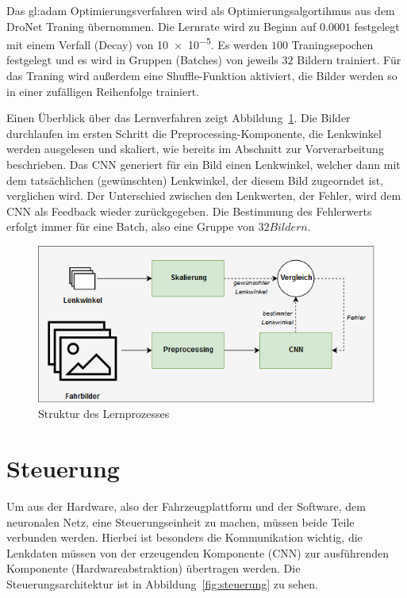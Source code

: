 Das \gls{gl:adam} Optimierungsverfahren \cite{kingma2014adam} wird als Optimierungsalgortihmus aus dem DroNet Traning übernommen.
Die Lernrate wird zu Beginn auf $0.0001$ festgelegt mit einem Verfall (Decay) von \num{10e-5}. Es werden $100$ Traningsepochen festgelegt und es wird in Gruppen (Batches) von jeweils $32$ Bildern trainiert. Für das Traning wird außerdem eine Shuffle-Funktion aktiviert, die Bilder werden so in einer zufälligen Reihenfolge trainiert.

Einen Überblick über das Lernverfahren zeigt Abbildung~\ref{img:lernarchitektur}. Die Bilder durchlaufen im ersten Schritt die Preprocessing-Komponente, die Lenkwinkel werden ausgelesen und skaliert, wie bereits im Abschnitt zur Vorverarbeitung beschrieben. Das CNN generiert für ein Bild einen Lenkwinkel, welcher dann mit dem tatsächlichen (gewünschten) Lenkwinkel, der diesem Bild zugeorndet ist, verglichen wird. Der Unterschied zwischen den Lenkwerten, der Fehler, wird dem CNN als Feedback wieder zurückgegeben. Die Bestimmung des Fehlerwerts erfolgt immer für eine Batch, also eine Gruppe von $32 Bildern$. 

\begin{figure}[h]
	\centering
	\includegraphics[width=\linewidth]{figures/Lernarchitektur.png}
	\caption{Struktur des Lernprozesses}
	\label{img:lernarchitektur}
\end{figure}

\newpage

\section{Steuerung}

Um aus der Hardware, also der Fahrzeugplattform und der Software, dem neuronalen Netz, eine Steuerungseinheit zu machen, müssen beide Teile verbunden werden. Hierbei ist besonders die Kommunikation wichtig, die Lenkdaten müssen von der erzeugenden Komponente (CNN) zur ausführenden Komponente (Hardwareabstraktion) übertragen werden. Die Steuerungsarchitektur ist in Abbildung~\ref{fig:steuerung} zu sehen.

